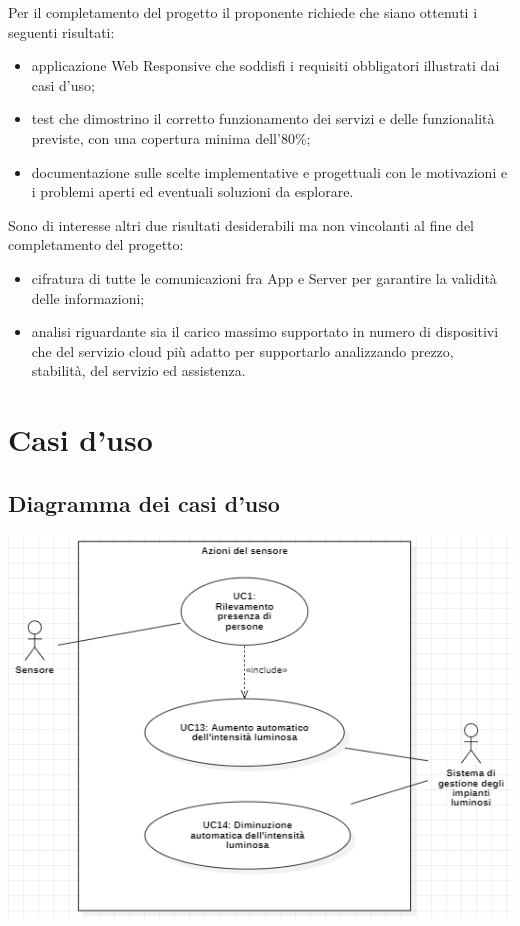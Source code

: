 \documentclass[a4paper, 12pt]{article}
\begin{document}
Per il completamento del progetto il proponente richiede che siano ottenuti i
seguenti risultati:
\begin{itemize}
    \item applicazione Web Responsive che soddisfi i requisiti obbligatori
    illustrati dai casi d'uso;
    \item test che dimostrino il corretto funzionamento dei servizi e delle
    funzionalità previste, con una copertura minima dell'80\%;
    \item documentazione sulle scelte implementative e progettuali con le
    motivazioni e i problemi aperti ed eventuali soluzioni da esplorare.
\end{itemize}
Sono di interesse altri due risultati desiderabili ma non vincolanti al fine del
completamento del progetto:
\begin{itemize}
    \item cifratura di tutte le comunicazioni fra App e Server per garantire la
    validità delle informazioni;
    \item analisi riguardante sia il carico massimo supportato in numero di
    dispositivi che del servizio cloud più adatto per supportarlo
    analizzando prezzo, stabilità, del servizio ed assistenza.
\end{itemize} 
\newpage
\section{Casi d'uso}

\subsection{Diagramma dei casi d'uso}

\includegraphics[scale=0.8]{diagramma_use_case_1.png}
\end{document}
